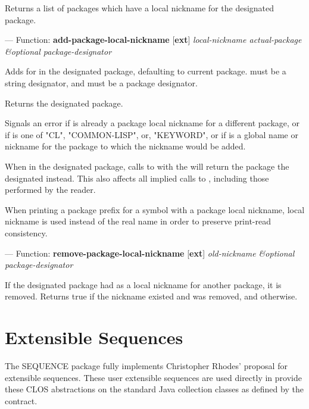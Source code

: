 \documentclass[10pt]{book}
\begin{document}
\begin{adjustwidth}{5em}{5em}
Returns a list of packages which have a local nickname for the
designated package.
\end{adjustwidth}

--- Function: \textbf{add-package-local-nickname} [\textbf{ext}] \textit{local-nickname actual-package \&optional package-designator}

\begin{adjustwidth}{5em}{5em}
  Adds  for  in the designated
  package, defaulting to current package.  must be
  a string designator, and  must be a package
  designator.

  Returns the designated package.

  Signals an error if  is already a package local
  nickname for a different package, or if  is one
  of "CL", "COMMON-LISP", or, "KEYWORD", or if  is
  a global name or nickname for the package to which the nickname would
  be added.

  When in the designated package, calls to  with the
   will return the package the designated
   instead. This also affects all implied calls to
  , including those performed by the reader.

  When printing a package prefix for a symbol with a package local
  nickname, local nickname is used instead of the real name in order to
  preserve print-read consistency.
\end{adjustwidth}

--- Function: \textbf{remove-package-local-nickname} [\textbf{ext}] \textit{old-nickname \&optional package-designator}

\begin{adjustwidth}{5em}{5em}
  If the designated package had  as a local nickname
  for another package, it is removed. Returns true if the nickname
  existed and was removed, and  otherwise.
\end{adjustwidth}

\section{Extensible Sequences}

The SEQUENCE package fully implements Christopher Rhodes' proposal for
extensible sequences.  These user extensible sequences are used
directly in  provide these CLOS
abstractions on the standard Java collection classes as defined by the
 contract.
\end{document}
